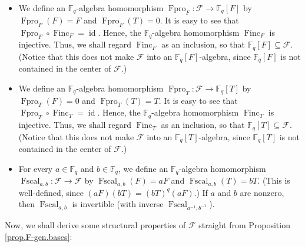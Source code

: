 \documentclass[numbers=enddot,12pt,final,onecolumn,notitlepage]{scrartcl}%
\theoremstyle{definition}
\begin{document}
\begin{itemize}
\item We define an $\mathbb{F}_{q}$-algebra homomorphism $\operatorname*{Fpro}%
\nolimits_{F}:\mathcal{F}\rightarrow\mathbb{F}_{q}\left[  F\right]  $ by
$\operatorname*{Fpro}\nolimits_{F}\left(  F\right)  =F$ and
$\operatorname*{Fpro}\nolimits_{F}\left(  T\right)  =0$. It is easy to see
that $\operatorname*{Fpro}\nolimits_{F}\circ\operatorname*{Finc}%
\nolimits_{F}=\operatorname*{id}$. Hence, the $\mathbb{F}_{q}$-algebra
homomorphism $\operatorname*{Finc}\nolimits_{F}$ is injective. Thus, we shall
regard $\operatorname*{Finc}\nolimits_{F}$ as an inclusion, so that
$\mathbb{F}_{q}\left[  F\right]  \subseteq\mathcal{F}$. (Notice that this does
not make $\mathcal{F}$ into an $\mathbb{F}_{q}\left[  F\right]  $-algebra,
since $\mathbb{F}_{q}\left[  F\right]  $ is not contained in the center of
$\mathcal{F}$.)

\item We define an $\mathbb{F}_{q}$-algebra homomorphism $\operatorname*{Fpro}%
\nolimits_{T}:\mathcal{F}\rightarrow\mathbb{F}_{q}\left[  T\right]  $ by
$\operatorname*{Fpro}\nolimits_{T}\left(  F\right)  =0$ and
$\operatorname*{Fpro}\nolimits_{T}\left(  T\right)  =T$. It is easy to see
that $\operatorname*{Fpro}\nolimits_{T}\circ\operatorname*{Finc}%
\nolimits_{T}=\operatorname*{id}$. Hence, the $\mathbb{F}_{q}$-algebra
homomorphism $\operatorname*{Finc}\nolimits_{T}$ is injective. Thus, we shall
regard $\operatorname*{Finc}\nolimits_{T}$ as an inclusion, so that
$\mathbb{F}_{q}\left[  T\right]  \subseteq\mathcal{F}$. (Notice that this does
not make $\mathcal{F}$ into an $\mathbb{F}_{q}\left[  T\right]  $-algebra,
since $\mathbb{F}_{q}\left[  T\right]  $ is not contained in the center of
$\mathcal{F}$.)

\item For every $a\in\mathbb{F}_{q}$ and $b\in\mathbb{F}_{q}$, we define an
$\mathbb{F}_{q}$-algebra homomorphism $\operatorname*{Fscal}\nolimits_{a,b}%
:\mathcal{F}\rightarrow\mathcal{F}$ by $\operatorname*{Fscal}\nolimits_{a,b}%
\left(  F\right)  =aF$ and $\operatorname*{Fscal}\nolimits_{a,b}\left(
T\right)  =bT$. (This is well-defined, since $\left(  aF\right)  \left(
bT\right)  =\left(  bT\right)  ^{q}\left(  aF\right)  $.) If $a$ and $b$ are
nonzero, then $\operatorname*{Fscal}\nolimits_{a,b}$ is invertible (with
inverse $\operatorname*{Fscal}\nolimits_{a^{-1},b^{-1}}$).
\end{itemize}

Now, we shall derive some structural properties of $\mathcal{F}$ straight from
Proposition \ref{prop.F-gen.bases}:
\end{document}
